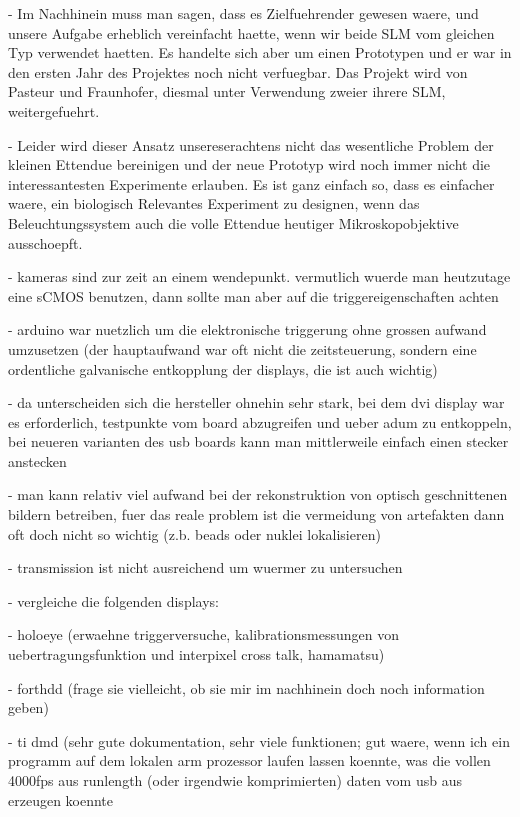 \documentclass[oneside,a4paper,12pt,BCOR20mm,DIV14]{scrbook} %
\begin{document}
- Im Nachhinein muss man sagen, dass es Zielfuehrender gewesen
    waere, und unsere Aufgabe erheblich vereinfacht haette, wenn wir
    beide SLM vom gleichen Typ verwendet haetten. Es handelte sich
    aber um einen Prototypen und er war in den ersten Jahr des
    Projektes noch nicht verfuegbar. Das Projekt wird von Pasteur und
    Fraunhofer, diesmal unter Verwendung zweier ihrere SLM,
    weitergefuehrt. 

  - Leider wird dieser Ansatz unsereserachtens nicht das wesentliche
    Problem der kleinen Ettendue bereinigen und der neue Prototyp wird
    noch immer nicht die interessantesten Experimente erlauben. Es ist
    ganz einfach so, dass es einfacher waere, ein biologisch
    Relevantes Experiment zu designen, wenn das Beleuchtungssystem
    auch die volle Ettendue heutiger Mikroskopobjektive ausschoepft.

- kameras sind zur zeit an einem wendepunkt. vermutlich wuerde man
  heutzutage eine sCMOS benutzen, dann sollte man aber auf die
  triggereigenschaften achten

- arduino war nuetzlich um die elektronische triggerung ohne grossen
  aufwand umzusetzen (der hauptaufwand war oft nicht die
  zeitsteuerung, sondern eine ordentliche galvanische entkopplung der
  displays, die ist auch wichtig)

  - da unterscheiden sich die hersteller ohnehin sehr stark, bei dem
    dvi display war es erforderlich, testpunkte vom board abzugreifen
    und ueber adum zu entkoppeln, bei neueren varianten des usb boards
    kann man mittlerweile einfach einen stecker anstecken

- man kann relativ viel aufwand bei der rekonstruktion von optisch
  geschnittenen bildern betreiben, fuer das reale problem ist die
  vermeidung von artefakten dann oft doch nicht so wichtig (z.b. beads
  oder nuklei lokalisieren)

- transmission ist nicht ausreichend um wuermer zu untersuchen  

- vergleiche die folgenden displays:

  - holoeye (erwaehne triggerversuche, kalibrationsmessungen von
    uebertragungsfunktion und interpixel cross talk, hamamatsu)

  - forthdd (frage sie vielleicht, ob sie mir im nachhinein doch noch
    information geben)

  - ti dmd (sehr gute dokumentation, sehr viele funktionen; gut waere,
    wenn ich ein programm auf dem lokalen arm prozessor laufen lassen
    koennte, was die vollen 4000fps aus runlength (oder irgendwie
    komprimierten) daten vom usb aus erzeugen koennte
\end{document}
